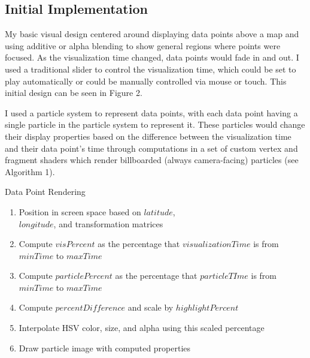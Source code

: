 \documentclass[conference]{acmsiggraph}
\begin{document}
\subsection{Initial Implementation}

My basic visual design centered around displaying data points above a map and
using additive or alpha blending to show general regions where points were
focused. As the visualization time changed, data points would fade in and out.
I used a traditional slider to control the visualization time, which could be
set to play automatically or could be manually controlled via mouse or touch.
This initial design can be seen in Figure 2.

I used a particle system to represent data points, with each data point having
a single particle in the particle system to represent it. These particles would
change their display properties based on the difference between the
visualization time and their data point's time through computations in a set
of custom vertex and fragment shaders which render billboarded (always
camera-facing) particles (see Algorithm 1).

\begin{algorithm}
\DontPrintSemicolon
\caption{Data Point Rendering}
     {
        \begin{enumerate}
            \item Position in screen space based on $latitude$, \\
                $longitude$, and transformation matrices
            \item Compute $visPercent$ as the percentage that
                $visualizationTime$ is from $minTime$ to $maxTime$
            \item Compute $particlePercent$ as the percentage that
                $particleTIme$ is from $minTime$ to $maxTime$
            \item Compute $percentDifference$ and scale by $highlightPercent$
            \item Interpolate HSV color, size, and alpha using this scaled
                percentage
            \item Draw particle image with computed properties
        \end{enumerate}
    }
\end{algorithm}
\end{document}
